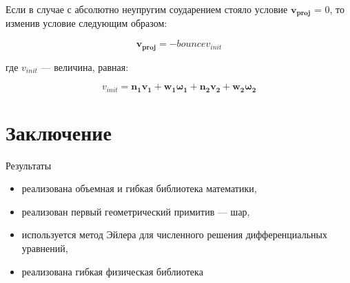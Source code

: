 \documentclass[xetex,12pt,compress,hyperref={xetex}]{beamer}
\begin{document}
  \begin{frame}
  Если в случае с абсолютно неупругим соударением стояло условие $\mathbf{v_{proj}}$ = 0, то изменив условие следующим образом:

  \begin{equation}
  \mathbf{v_{proj}} = -bounce {v_{init}}
  \end{equation}
  
  где $v_{init}$ --- величина, равная:

  \begin{equation}
    v_{init}  = \mathbf{n_1}\mathbf{v_1} + \mathbf{w_1}\mathbf{\omega_{1}}
    + \mathbf{n_2}\mathbf{v_2} + \mathbf{w_2}\mathbf{\omega_{2}}
  \end{equation}
  
 \end{frame}
 
 \section{Заключение}
  \begin{frame}{Результаты}
  \begin{itemize}
    \item реализована объемная и гибкая библиотека математики,
    \item реализован первый геометрический примитив --- шар,
    \item используется метод Эйлера для численного решения дифференциальных уравнений,
    \item реализована гибкая физическая библиотека 
  \end{itemize}
 \end{frame} 
 
 
 
\end{document}
